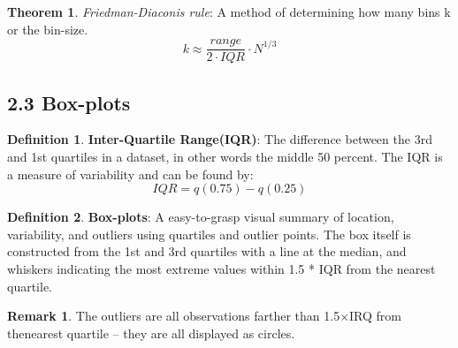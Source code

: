 \documentclass[12pt]{amsart}
\theoremstyle{definition}
\newtheorem{theorem}{Theorem}  %
\newtheorem{definition}{Definition} %
\newtheorem*{remark}{Remark}        %
\numberwithin{equation}{theorem}    %
\begin{document}
\begin{theorem}
    \textit{Friedman-Diaconis rule}:
    A method of determining how many bins k or the bin-size. $$k \approx \frac{range}{2 \cdot IQR} \cdot N^{1/3}$$
\end{theorem}

\subsection*{2.3 Box-plots}
\begin{definition}
    \textbf{Inter-Quartile Range(IQR)}:
    The difference between the 3rd and 1st quartiles in a dataset, in other words the middle 50 percent. The IQR is a measure of variability and can be found by:
    $$IQR = q(0.75)- q(0.25)$$
\end{definition}

\begin{definition}
    \textbf{Box-plots}:
    A easy-to-grasp visual summary of location, variability, and outliers using quartiles and outlier points. The box itself is constructed from the 1st and 3rd quartiles with a line at the median, and whiskers indicating the most extreme values within 1.5 * IQR from the nearest quartile.

    \begin{remark}
        The outliers are all observations farther than 1.5×IRQ from thenearest quartile – they are all displayed as circles.
    \end{remark}
\end{definition}
\end{document}

